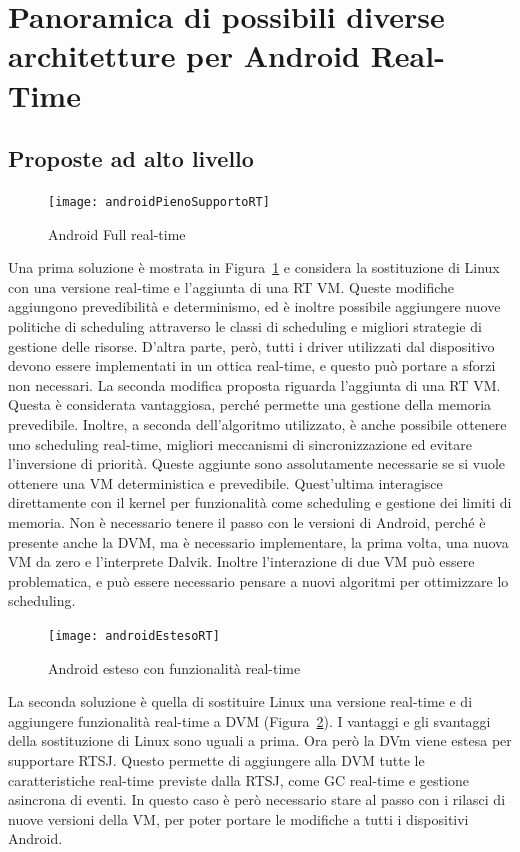 \section{Panoramica di possibili diverse architetture per Android Real-Time}
\subsection{Proposte ad alto livello}
\begin{figure}[h]
	\centering
	\texttt{[image: androidPienoSupportoRT]}
	\caption{Android Full real-time}
	\label{fig:androidpienosupportort}
\end{figure}
Una prima soluzione è mostrata in Figura~\ref{fig:androidpienosupportort} e considera la sostituzione di Linux con una versione real-time e l'aggiunta di una RT VM. Queste modifiche aggiungono prevedibilità e determinismo, ed è inoltre possibile aggiungere nuove politiche di scheduling attraverso le classi di scheduling e migliori strategie di gestione delle risorse. D'altra parte, però, tutti i driver utilizzati dal dispositivo devono essere implementati in un ottica real-time, e questo può portare a sforzi non necessari. La seconda modifica proposta riguarda l'aggiunta di una RT VM. Questa è considerata vantaggiosa, perché permette una gestione della memoria prevedibile. Inoltre, a seconda dell'algoritmo utilizzato, è anche possibile ottenere uno scheduling real-time, migliori meccanismi di sincronizzazione ed evitare l'inversione di priorità. Queste aggiunte sono assolutamente necessarie se si vuole ottenere una VM deterministica e prevedibile. Quest'ultima interagisce direttamente con il kernel per funzionalità come scheduling e gestione dei limiti di memoria. Non è necessario tenere il passo con le versioni di Android, perché è presente anche la DVM, ma è necessario implementare, la prima volta, una nuova VM da zero e l'interprete Dalvik. Inoltre l'interazione di due VM può essere problematica, e può essere necessario pensare a nuovi algoritmi per ottimizzare lo scheduling.

\begin{figure}[h]
	\centering
	\texttt{[image: androidEstesoRT]}
	\caption{Android esteso con funzionalità real-time}
	\label{fig:androidestesort}
\end{figure}
La seconda soluzione è quella di sostituire Linux una versione real-time e di aggiungere funzionalità real-time a DVM (Figura~\ref{fig:androidestesort}). I vantaggi e gli svantaggi della sostituzione di Linux sono uguali a prima. Ora però la DVm viene estesa per supportare RTSJ. Questo permette di aggiungere alla DVM tutte le caratteristiche real-time previste dalla RTSJ, come GC real-time e gestione asincrona di eventi. In questo caso è però necessario stare al passo con i rilasci di nuove versioni della VM, per poter portare le modifiche a tutti i dispositivi Android.

